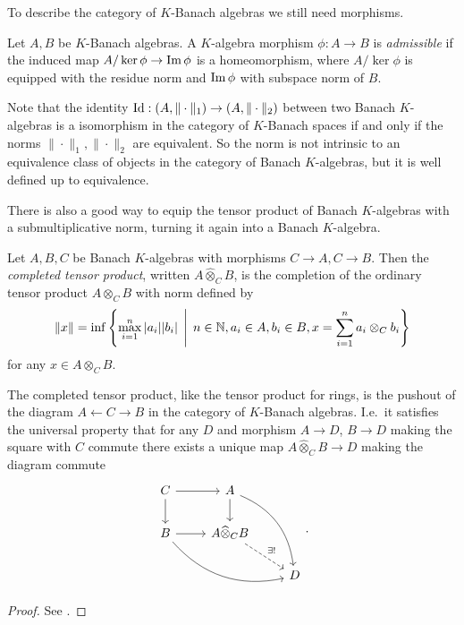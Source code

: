 To describe the category of $K$-Banach algebras we still need morphisms.
\begin{definition}
	Let $A, B$ be $K$-Banach algebras. 
	A $K$-algebra morphism $\phi: A \to B$ is \emph{admissible}  if the induced map $A / \ker \phi \to \im \phi$ is a homeomorphism, where $A / \ker \phi$ is equipped with the residue norm and $\im \phi$ with subspace norm of $B$. 
\end{definition}

\begin{remark}\label{rem:uniqueness_norm_banach_algebra}
	Note that the identity  $\operatorname{Id}: (A, \|\cdot \|_1) \to (A, \|\cdot \|_2)$ between two Banach $K$-algebras is a isomorphism in the category of $K$-Banach spaces if and only if the norms $\|\cdot \|_1, \|\cdot \|_2$ are equivalent. 
	So the norm is not intrinsic to an equivalence class of objects in the category of Banach  $K$-algebras, but it is well defined up to equivalence. 
\end{remark}

There is also a good way to equip the tensor product of Banach $K$-algebras with a submultiplicative norm, turning it again into a Banach $K$-algebra.
\begin{definition}
	Let $A, B, C$ be Banach $K$-algebras with morphisms  $C\to A, C \to B$. Then the \emph{completed tensor product}, written $A \widehat \otimes_C B$, is the completion of the ordinary tensor product $A \otimes_C B$ with norm defined by \[
		\|x\| = \inf \left\{\max_{i = 1}^{n} |a_i||b_i|  \st n \in \N, a_i \in A, b_i \in B, x = \sum_{i = 1}^{n} a_i \otimes_C b_i\right\} 
	\] 
	for any $x \in A \otimes_C B$. 
\end{definition}

\begin{proposition}\label{prop:universal_prop_complete_tensor}
	The completed tensor product, like the tensor product for rings, is the pushout of the diagram $A \leftarrow C \to B$ in the category of  $K$-Banach algebras. I.e.\ it satisfies the universal property that for any  $D$ and morphism $A \to D$,  $B \to D$ making the square with $C$ commute there exists a unique map $A \widehat\otimes_C B \to D$ making the diagram commute\[
	\begin{tikzcd}
		C \rar \dar & A \dar \ar[bend left]{rdd} \\
		B \rar \ar[bend right]{drr} &  A \widehat{\otimes}_C B \ar[dashed]{dr}{\exists !} \\
		 & & D
	\end{tikzcd}
	.\] 
\end{proposition}
\begin{proof}
	See \cite[][section 2.1.7]{siegfriedboschNonArchimedeanAnalysisSystematic1984}. 
\end{proof}

